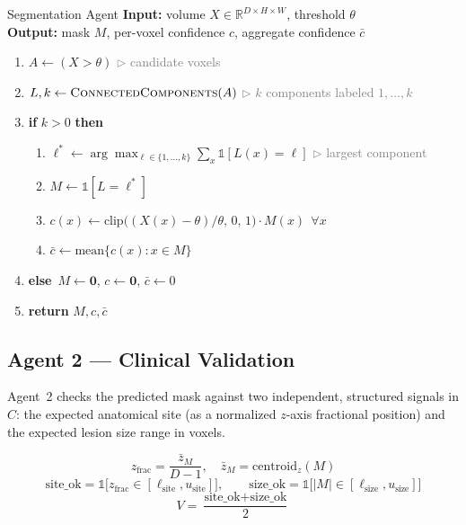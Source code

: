 \documentclass[11pt,a4paper]{article}
\newenvironment{algosteps}{\begin{enumerate}[label=\arabic*:, leftmargin=2.1em, itemsep=1pt, topsep=2pt]}{\end{enumerate}}
\newcommand{\algoreturn}[1]{\textbf{return} #1}
\newcommand{\algoif}[1]{\textbf{if} #1 \textbf{then}}
\newcommand{\algoelse}{\textbf{else}}
\newcommand{\algocomment}[1]{\hfill\textcolor{gray}{\footnotesize $\triangleright$ #1}}
\begin{document}
\begin{algobox}{Segmentation Agent}
\textbf{Input:} volume $X \in \mathbb{R}^{D\times H\times W}$, threshold $\theta$ \\
\textbf{Output:} mask $M$, per-voxel confidence $c$, aggregate confidence $\bar c$
\begin{algosteps}
\item $A \gets (X > \theta)$ \algocomment{candidate voxels}
\item $L, k \gets \textsc{ConnectedComponents}(A)$ \algocomment{$k$ components labeled $1,\dots,k$}
\item \algoif{$k > 0$}
\begin{algosteps}
\item $\ell^\ast \gets \arg\max_{\ell \in \{1,\dots,k\}} \sum_x \mathbb{1}[L(x)=\ell]$ \algocomment{largest component}
\item $M \gets \mathbb{1}[L = \ell^\ast]$
\item $c(x) \gets \text{clip}\big((X(x)-\theta)/\theta,\,0,\,1\big) \cdot M(x)\ \ \forall x$
\item $\bar c \gets \text{mean}\{c(x) : x \in M\}$
\end{algosteps}
\item \algoelse\ $M \gets \mathbf{0}$, \quad $c \gets \mathbf{0}$, \quad $\bar c \gets 0$
\item \algoreturn{$M, c, \bar c$}
\end{algosteps}
\end{algobox}

\subsection{Agent 2 --- Clinical Validation}
Agent~2 checks the predicted mask against two independent, structured signals in $C$: the expected anatomical site (as a normalized $z$-axis fractional position) and the expected lesion size range in voxels.

\begin{formulabox}
\begin{equation}
z_{\text{frac}} = \frac{\bar{z}_M}{D - 1}, \quad \bar{z}_M = \text{centroid}_z(M)
\label{eq:zfrac}
\end{equation}
\begin{equation}
\text{site\_ok} = \mathbb{1}\big[z_{\text{frac}} \in [\ell_{\text{site}}, u_{\text{site}}]\big], \qquad
\text{size\_ok} = \mathbb{1}\big[|M| \in [\ell_{\text{size}}, u_{\text{size}}]\big]
\label{eq:checks}
\end{equation}
\begin{equation}
V = \frac{\text{site\_ok} + \text{size\_ok}}{2}
\label{eq:V}
\end{equation}
\end{formulabox}
\end{document}
